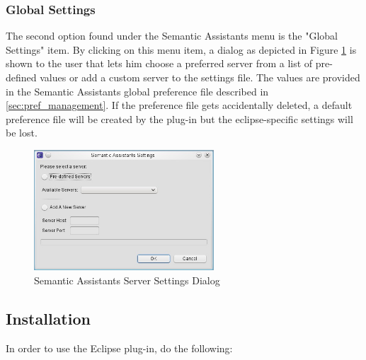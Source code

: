 \subsubsection{Global Settings}
The second option found under the Semantic Assistants menu is the "Global
Settings" item. By clicking on this menu item, a dialog as depicted in Figure \ref{fig:eclipse_settings} is shown to the user that lets him choose a preferred server from a list of pre-defined values or add a custom server to the settings file. The values are provided in the Semantic Assistants global preference file described in \ref{sec:pref_management}. If the preference file gets accidentally deleted, a default preference file will be created by the plug-in but the eclipse-specific settings will be lost.
\begin{figure}[htb]
\begin{center}
  \includegraphics[width=0.6\textwidth]{pictures/eclipse_settings.jpg}
  \caption{Semantic Assistants Server Settings Dialog}
  \label{fig:eclipse_settings}
\end{center}
\end{figure}

\subsection{Installation}
\label{subsec:eclipse_install}
In order to use the Eclipse plug-in, do the following:

